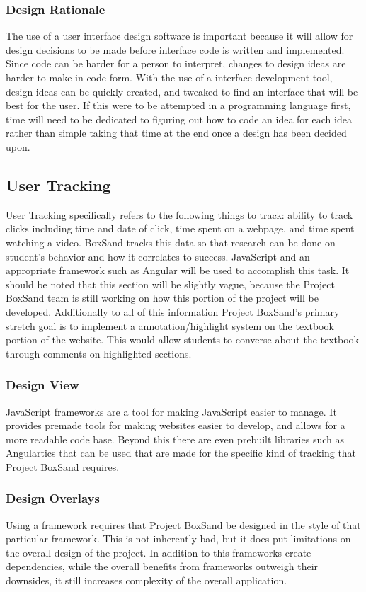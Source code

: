 \documentclass[onecolumn, draftclsnofoot,10pt, compsoc]{IEEEtran}
\begin{document}
\subsubsection{Design Rationale}
The use of a user interface design software is important because it will allow for design decisions to be made before interface code is written and implemented. Since code can be harder for a person to interpret, changes to design ideas are harder to make in code form. With the use of a interface development tool, design ideas can be quickly created, and tweaked to find an interface that will be best for the user.  If this were to be attempted in a programming language first, time will need to be dedicated to figuring out how to code an idea for each idea rather than simple taking that time at the end once a design has been decided upon. 


\subsection{User Tracking}
User Tracking specifically refers to the following things to track: ability to track clicks including time and date of click, time spent on a webpage, and time spent watching a video. BoxSand tracks this data so that research can be done on student's behavior and how it correlates to success. JavaScript and an appropriate framework such as Angular will be used to accomplish this task. It should be noted that this section will be slightly vague, because the Project BoxSand team is still working on how this portion of the project will be developed. Additionally to all of this information Project BoxSand's primary stretch goal is to implement a annotation/highlight system on the textbook portion of the website. This would allow students to converse about the textbook through comments on highlighted sections. 
\subsubsection{Design View}
JavaScript frameworks are a tool for making JavaScript easier to manage. It provides premade tools for making websites easier to develop, and allows for a more readable code base. Beyond this there are even prebuilt libraries such as Angulartics that can be used that are made for the specific kind of tracking that Project BoxSand requires. 
\subsubsection{Design Overlays}
Using a framework requires that Project BoxSand be designed in the style of that particular framework. This is not inherently bad, but it does put limitations on the overall design of the project. In addition to this frameworks create dependencies, while the overall benefits from frameworks outweigh their downsides, it still increases complexity of the overall application. 
\end{document}
